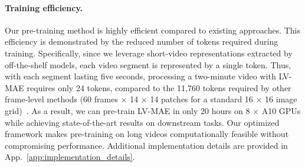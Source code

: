 \paragraph{Training efficiency.} Our pre-training method is highly efficient compared to existing approaches. This efficiency is demonstrated by the reduced number of tokens required during training. Specifically, since we leverage short-video representations extracted by off-the-shelf models, each video segment is represented by a single token. Thus, with each segment lasting five seconds, processing a two-minute video with LV-MAE requires only 24 tokens, compared to the 11,760 tokens required by other frame-level methods (60 frames $\times$ 14 $\times$ 14 patches for a standard 16 $\times$ 16 image grid)~\cite{li2024videomamba, tong2022videomae, wang2023videomae, islam2022long, lin2022learning}.
As a result, we can pre-train LV-MAE in only 20 hours on 8 $\times$ A10 GPUs while achieving state-of-the-art results on downstream tasks. 
Our optimized framework makes pre-training on long videos computationally feasible without compromising performance. Additional implementation details are provided in App.~\ref{app:implementation_details}.


